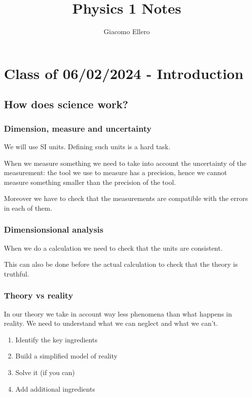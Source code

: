 \documentclass[14pt]{extarticle}
\title{Physics 1 Notes}
\author{Giacomo Ellero}
\begin{document}
\maketitle
\tableofcontents
\clearpage

\section{Class of 06/02/2024 - Introduction}

\subsection{How does science work?}

\subsubsection{Dimension, measure and uncertainty}

We will use SI units. Defining such units is a hard task.

When we measure something we need to take into account the uncertainty of the measurement:
the tool we use to measure has a precision, hence we cannot measure something smaller than the precision of the tool.

Moreover we have to check that the measurements are compatible with the errors in each of them.

\subsubsection{Dimensionsional analysis}

When we do a calculation we need to check that the units are consistent.

This can also be done before the actual calculation to check that the theory is truthful.

\subsubsection{Theory vs reality}

In our theory we take in account way less phenomena than what happens in reality.
We need to understand what we can neglect and what we can't.

\begin{enumerate}
  \item Identify the key ingredients
  \item Build a simplified model of reality
  \item Solve it (if you can)
  \item Add additional ingredients
\end{enumerate}
\end{document}
